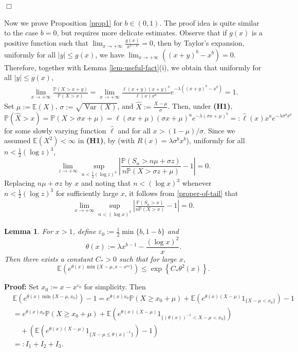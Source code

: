 \documentclass[11pt]{article}
\newtheorem{lemma}[thrm]{Lemma}
\numberwithin{equation}{section}
\begin{document}
\hfill$\Box$



Now we prove Proposition \ref{prop1} for $b \in (0,1)$. The proof idea is quite similar to the case $b = 0$, but requires more delicate estimates. Observe that if $g(x)$ is a positive function such that $\lim_{x \to +\infty} \frac{g(x)}{x^{1-b}} = 0$, then by Taylor's expansion, uniformly for all $|y| \leq g(x)$, we have $\lim_{x \to +\infty} ((x+y)^b - x^b) = 0$. Therefore, together with Lemma \ref{lem-useful-fact}(i), we obtain that uniformly for all $|y| \leq g(x)$,
\begin{align}\label{proper-of-tail}
	\lim_{x \to +\infty} \frac{\mathbb{P}(X > x + y)}{\mathbb{P}(X > x)} = \lim_{x \to +\infty} \frac{\ell(x + y) (x + y)^a}{\ell(x) x^a} e^{-\lambda ((x+y)^b - x^b)} = 1.
\end{align}
Set $\mu := \mathbb{E}(X)$, $\sigma := \sqrt{\operatorname{Var}(X)}$, and $\widehat{X} := \frac{X - \mu}{\sigma}$. Then, under {\bf(H1)}, 
\[
\mathbb{P}(\widehat{X} > x) = \mathbb{P}(X > \sigma x + \mu) = \ell(\sigma x + \mu) (\sigma x + \mu)^a e^{-\lambda (\sigma x + \mu)^b} =: \widehat{\ell}(x) x^a e^{-\lambda \sigma^b x^b}
\]
for some slowly varying function $\widehat{\ell}$ and for all $x > (1 - \mu)/\sigma$. Since we assumed $\mathbb{E}(X^2) < \infty$ in {\bf(H1)}, by \cite[Theorem 8.3]{DDS2008} (with $R(x) = \lambda \sigma^b x^b$), uniformly for all $n < \frac{1}{2} (\log z)^3$,
\[
\lim_{z \to +\infty} \sup_{n<\frac{1}{2}(\log z)^3} \left| \frac{\mathbb{P}(S_n > n\mu + \sigma z)}{n \mathbb{P}(X > \sigma z + \mu)} -1\right|=0.
\]
Replacing $n\mu + \sigma z$ by $x$ and noting that $n < (\log x)^3$ whenever $n < \frac{1}{2} (\log z)^3$ for sufficiently large $x$, it follows from \eqref{proper-of-tail} that
\begin{align}\label{e6}
	\lim_{x \to +\infty} \sup_{n < (\log x)^3} \left| \frac{\mathbb{P}(S_n > x)}{n \mathbb{P}(X > x)} - 1 \right| = 0.
\end{align}
 
\begin{lemma}\label{lem2}
	For $x>1$, define $\varepsilon_0:= \frac{1}{2}\min\{ b, 1-b\}$ and
	\[
	\theta(x):= \lambda x^{b-1}-\frac{(\log x)^2}{x}.
	\]
	 Then there exists a constant $C_*>0$ such that for large $x$,
	 \[
	 \mathbb{E}\left(e^{ \theta(x) \min\{ X-\mu, x-x^{\varepsilon_0} \} }\right)  \leq \exp\left\{C_* \theta^2(x)\right\}.
	 \]
\end{lemma}
\textbf{Proof: }  Set $x_0:=x-x^{\varepsilon_0}$ for simplicity. Then 
\begin{align}
	 & \mathbb{E}\left( e^{ \theta(x) \min\{ X-\mu, x_0 \} }\right) -1 = e^{\theta(x)x_0}\mathbb{P}(X\geq x_0+\mu)+\mathbb{E}\left(e^{\theta(x)(X-\mu)}1_{\{X-\mu <x_0\}}\right)-1\nonumber\\
	 & = e^{\theta(x)x_0}\mathbb{P}(X\geq x_0+\mu)+ \mathbb{E}\left(e^{\theta(x)(X-\mu)}1_{\{(\theta(x))^{-1}< X-\mu <x_0\}}\right)\nonumber\\
	 &\quad +\left(\mathbb{E}\left(e^{\theta(x)(X-\mu)}1_{\{X-\mu \leq \theta(x)^{-1}\}}\right)-1\right)\nonumber\\
	 &=:  I_1+I_2+I_3.
\end{align}
\end{document}
